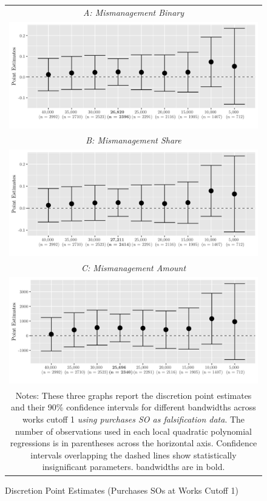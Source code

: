 \documentclass[11pt]{article}
\begin{document}
\begin{figure}[!htbp]
  \caption{Discretion Point Estimates (Purchases SOs at Works Cutoff 1)}
  \label{fig:01falsification}
  \centering
  \small
  \begin{tabular}{c}
  \emph{A: Mismanagement Binary} \\
  \includegraphics[scale = .14]{01falsificationplot1} \\
  \emph{B: Mismanagement Share} \\
  \includegraphics[scale = .14]{01falsificationplot2} \\
  \emph{C: Mismanagement Amount} \\
  \includegraphics[scale = .14]{01falsificationplot3} \\
  \multicolumn{1}{p{.67\textwidth}}{\scriptsize Notes: These three graphs report the discretion point estimates and their 90\% confidence intervals for different bandwidths across works cutoff 1 \emph{using purchases SO as falsification data}. The number of observations used in each local quadratic polynomial regressions is in parentheses across the horizontal axis. Confidence intervals overlapping the dashed lines show statistically insignificant parameters. \citet{CalonicoOptimalDataDrivenRegression2015} bandwidths are in bold.}
  \end{tabular}
\end{figure}
\end{document}
